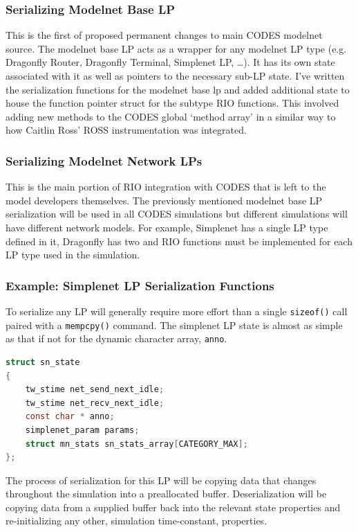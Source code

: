 \documentclass[letterpaper, 11 pt, conference]{IEEEtran}
\begin{document}
\subsubsection{Serializing Modelnet Base LP}
This is the first of proposed permanent changes to main CODES modelnet source. The modelnet base LP acts as a wrapper for any modelnet LP type (e.g. Dragonfly Router, Dragonfly Terminal, Simplenet LP, \ldots). It has its own state associated with it as well as pointers to the necessary sub-LP state. I've written the serialization functions for the modelnet base lp and added additional state to house the function pointer struct for the subtype RIO functions. This involved adding new methods to the CODES global `method array' in a similar way to how Caitlin Ross' ROSS instrumentation was integrated.

\subsubsection{Serializing Modelnet Network LPs}
This is the main portion of RIO integration with CODES that is left to the model developers themselves. The previously mentioned modelnet base LP serialization will be used in all CODES simulations but different simulations will have different network models. For example, Simplenet has a single LP type defined in it, Dragonfly has two and RIO functions must be implemented for each LP type used in the simulation. 


\subsubsection{Example: Simplenet LP Serialization Functions}
To serialize any LP will generally require more effort than a single \texttt{sizeof()} call paired with a \texttt{mempcpy()} command. The simplenet LP state is almost as simple as that if not for the dynamic character array, \texttt{anno}.

\begin{lstlisting}[language=C]
struct sn_state
{
	tw_stime net_send_next_idle;
	tw_stime net_recv_next_idle;
	const char * anno;
	simplenet_param params;
	struct mn_stats sn_stats_array[CATEGORY_MAX];
};
\end{lstlisting}

The process of serialization for this LP will be copying data that changes throughout the simulation into a preallocated buffer. Deserialization will be copying data from a supplied buffer back into the relevant state properties and re-initializing any other, simulation time-constant, properties.
\end{document}
